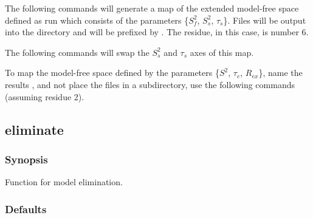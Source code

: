 The following commands will generate a map of the extended model-free space defined as run
 which consists of the parameters \{$S^2_f$, $S^2_s$, $\tau_s$\}.  Files will be output into the
directory 
 and will be prefixed by 
.  The residue, in this case, is number 6.








The following commands will swap the $S^2_s$ and $\tau_s$ axes of this map.





To map the model-free space 
 defined by the parameters \{$S^2$, $\tau_e$, $R_{ex}$\}, name the results
, and not place the files in a subdirectory, use the following commands (assuming
residue 2).





\newpage

\subsection{eliminate}


\subsubsection{Synopsis}

Function for model elimination.

\subsubsection{Defaults}

